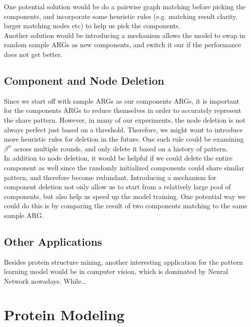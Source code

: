 One potential solution would be do a pairwise graph matching before picking the components, and incorporate some heuristic rules (e.g. matching result clarity, larger matching nodes etc) to help us pick the components.\\

Another solution would be introducing a mechanism allows the model to swap in random sample ARGs as new components, and switch it our if the performance does not get better.

\subsection{Component and Node Deletion}

Since we start off with sample ARGs as our components ARGs, it is important for the components ARGs to reduce themselves in order to accurately represent the share pattern. However, in many of our experiments, the node deletion is not always perfect just based on a threshold. Therefore, we might want to introduce more heuristic rules for deletion in the future. One such rule could be examining $\beta^w$ across multiple rounds, and only delete it based on a history of pattern.\\

In addition to node deletion, it would be helpful if we could delete the entire component as well since the randomly initialized components could share similar pattern, and therefore become redundant. Introducing a mechanism for component deletion not only allow us to start from a relatively large pool of components, but also help us speed up the model training. One potential way we could do this is by comparing the result of two components matching to the same sample ARG.

\subsection{Other Applications}

Besides protein structure mining, another interesting application for the pattern learning model would be in computer vision, which is dominated by Neural Network nowadays. While...

\section{Protein Modeling}

